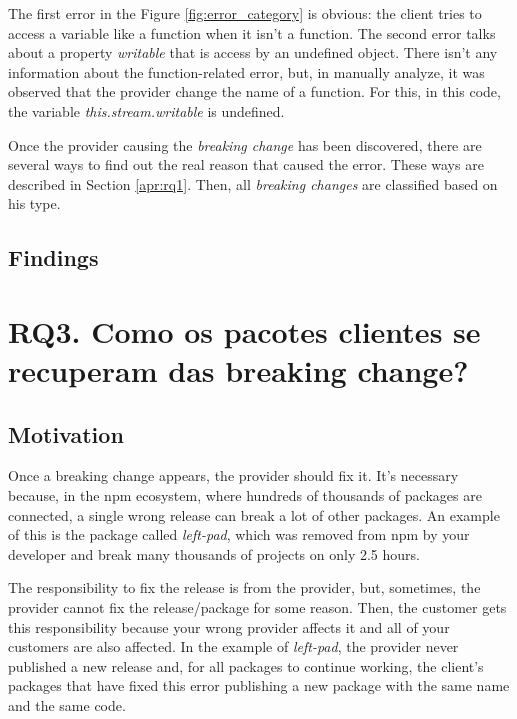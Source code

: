 The first error in the Figure \ref{fig:error_category} is obvious: the client tries to access a variable like a function when it isn't a function. The second error talks about a property \textit{writable} that is access by an undefined object. There isn't any information about the function-related error, but, in manually analyze, it was observed that the provider change the name of a function. For this, in this code, the variable \textit{this.stream.writable} is undefined.

Once the provider causing the \textit{breaking change} has been discovered, there are several ways to find out the real reason that caused the error. These ways are described in Section \ref{apr:rq1}. Then, all \textit{breaking changes} are classified based on his type.

\subsection{Findings}
\label{fin:rq2}

\section{RQ3. Como os pacotes clientes se recuperam das breaking change?}
\label{sec:rq3}

\subsection{Motivation}
\label{mot:rq3}

Once a breaking change appears, the provider should fix it. It’s necessary because, in the npm ecosystem, where hundreds of thousands of packages are connected, a single wrong release can break a lot of other packages. An example of this is the package called \textit{left-pad}, which was removed from npm by your developer and break many thousands of projects on only 2.5 hours.

The responsibility to fix the release is from the provider, but, sometimes, the provider cannot fix the release/package for some reason. Then, the customer gets this responsibility because your wrong provider affects it and all of your customers are also affected. In the example of \textit{left-pad}, the provider never published a new release and, for all packages to continue working, the client's packages that have fixed this error publishing a new package with the same name and the same code.

